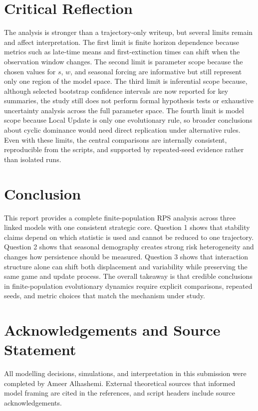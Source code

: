 \documentclass[11pt,a4paper]{article}
\begin{document}
\section{Critical Reflection}
The analysis is stronger than a trajectory-only writeup, but several limits remain and affect interpretation. The first limit is finite horizon dependence because metrics such as late-time means and first-extinction times can shift when the observation window changes. The second limit is parameter scope because the chosen values for $s$, $w$, and seasonal forcing are informative but still represent only one region of the model space. The third limit is inferential scope because, although selected bootstrap confidence intervals are now reported for key summaries, the study still does not perform formal hypothesis tests or exhaustive uncertainty analysis across the full parameter space. The fourth limit is model scope because Local Update is only one evolutionary rule, so broader conclusions about cyclic dominance would need direct replication under alternative rules. Even with these limits, the central comparisons are internally consistent, reproducible from the scripts, and supported by repeated-seed evidence rather than isolated runs.

\section{Conclusion}
This report provides a complete finite-population RPS analysis across three linked models with one consistent strategic core. Question 1 shows that stability claims depend on which statistic is used and cannot be reduced to one trajectory. Question 2 shows that seasonal demography creates strong risk heterogeneity and changes how persistence should be measured. Question 3 shows that interaction structure alone can shift both displacement and variability while preserving the same game and update process. The overall takeaway is that credible conclusions in finite-population evolutionary dynamics require explicit comparisons, repeated seeds, and metric choices that match the mechanism under study.

\section*{Acknowledgements and Source Statement}
All modelling decisions, simulations, and interpretation in this submission were completed by Ameer Alhashemi. External theoretical sources that informed model framing are cited in the references, and script headers include source acknowledgements.



\end{document}
